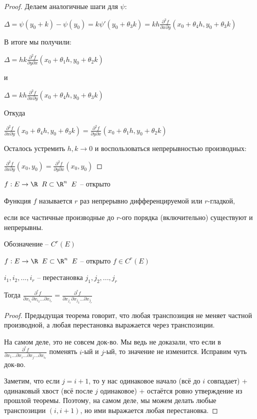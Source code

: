 \begin{proof}
	Делаем аналогичные шаги для $\psi$:
	
	$\Delta = \psi(y_0 + k) - \psi(y_0) = k\psi'(y_0 + \theta_3 k) = kh\frac{\partial^2 f}{\partial x \partial y}(x_0 + \theta_4 h, y_0 + \theta_3 k) $
	
	В итоге мы получили:

	$\Delta = hk \frac{\partial^2 f}{\partial y \partial x} (x_0 + \theta_1 h, y_0 + \theta_2 k)$

	и

	$\Delta = kh\frac{\partial^2 f}{\partial x \partial y}(x_0 + \theta_4 h, y_0 + \theta_3 k)$
	
	Откуда
	
	$\frac{\partial^2 f}{\partial x \partial y} (x_0 + \theta_4 h, y_0 + \theta_3 k) = \frac{\partial^2 f}{\partial y \partial x} (x_0 + \theta_1 h, y_0 + \theta_2 k) $

	Осталось устремить $h,k\to 0$ и воспользоваться непрерывностью производных:
	
	$\frac{\partial^2 f}{\partial x \partial y} (x_0, y_0) =\frac{\partial^2 f}{\partial y \partial x} (x_0, y_0) $
	
	
\end{proof}

\begin{definition}\slashns
	
	$f: E \to \R \;\; R\subset \R^n \;\; E$ -- открыто
	
	Функция $f$ называется $r$ раз непрерывно дифференцируемой или $r$-гладкой,
	
	если все частичные производные до $r$-ого порядка (включительно) существуют и непрерывны.
	
	Обозначение -- $C^r(E)$
\end{definition}

\begin{theorem}\slashns
	
	$f: E \to \R \;\; E \subset \R^n \;\; E$ -- открыто $f \in C^r(E)$
	
	$i_1, i_2, ...,i_r$ -- перестановка $j_1, j_2, ... , j_r$
	
	Тогда $\frac{\partial^r f}{\partial x_{i_1} \partial x_{i_2}...\partial x_{i_r}  } = \frac{\partial^r f}{\partial x_{j_1} \partial x_{j_2}...\partial x_{j_r}  }$
\end{theorem}

\begin{proof}\slashns
	
	Предыдущая теорема говорит, что любая транспозиция не меняет частной производной, а любая перестановка выражается через транспозиции. 

	На самом деле, это не совсем док-во. Мы ведь не доказали, что если в
	$\frac{\partial^r f}{\partial x_1... \partial x_i...\partial x_j...\partial x_{i_r}  }$ поменять $i$-ый и $j$-ый, то значение не изменится. Исправим чуть док-во.

	Заметим, что если $j=i+1$, то у нас одинаковое начало (всё до $i$ совпадает) + одинаковый хвост (всё после $j$ одинаковое) + остаётся ровно утверждение из прошлой теоремы. Поэтому, на самом деле, мы можем делать любые транспозиции $(i, i+1)$, но ими выражается любая перестановка.
\end{proof}

